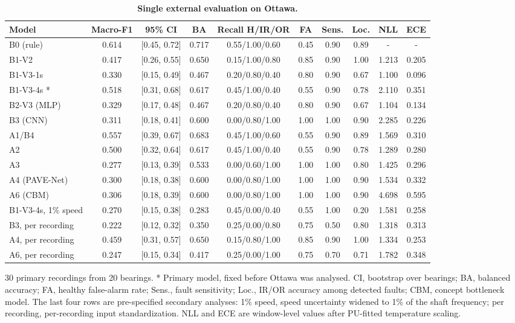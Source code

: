 \documentclass[10pt,letterpaper]{article}
\begin{document}
\begin{table}[!ht]
\centering
\caption{\textbf{Single external evaluation on Ottawa.}}
{\footnotesize
\setlength{\tabcolsep}{4pt}
\renewcommand{\arraystretch}{1.25}
\begin{tabular}{lccccccccc}
\hline
Model & Macro-F1 & 95\% CI & BA & Recall H/IR/OR & FA & Sens. & Loc. & NLL & ECE \\
\hline
B0 (rule) & 0.614 & [0.45, 0.72] & 0.717 & 0.55/1.00/0.60 & 0.45 & 0.90 & 0.89 & - & - \\
B1-V2 & 0.417 & [0.26, 0.55] & 0.650 & 0.15/1.00/0.80 & 0.85 & 0.90 & 1.00 & 1.213 & 0.205 \\
B1-V3-1s & 0.330 & [0.15, 0.49] & 0.467 & 0.20/0.80/0.40 & 0.80 & 0.90 & 0.67 & 1.100 & 0.096 \\
B1-V3-4s * & 0.518 & [0.31, 0.68] & 0.617 & 0.45/1.00/0.40 & 0.55 & 0.90 & 0.78 & 2.110 & 0.351 \\
B2-V3 (MLP) & 0.329 & [0.17, 0.48] & 0.467 & 0.20/0.80/0.40 & 0.80 & 0.90 & 0.67 & 1.104 & 0.134 \\
B3 (CNN) & 0.311 & [0.18, 0.41] & 0.600 & 0.00/0.80/1.00 & 1.00 & 1.00 & 0.90 & 2.285 & 0.226 \\
A1/B4 & 0.557 & [0.39, 0.67] & 0.683 & 0.45/1.00/0.60 & 0.55 & 0.90 & 0.89 & 1.569 & 0.310 \\
A2 & 0.500 & [0.32, 0.64] & 0.617 & 0.45/1.00/0.40 & 0.55 & 0.90 & 0.78 & 1.289 & 0.280 \\
A3 & 0.277 & [0.13, 0.39] & 0.533 & 0.00/0.60/1.00 & 1.00 & 1.00 & 0.80 & 1.425 & 0.296 \\
A4 (PAVE-Net) & 0.300 & [0.18, 0.38] & 0.600 & 0.00/0.80/1.00 & 1.00 & 1.00 & 0.90 & 1.534 & 0.332 \\
A6 (CBM) & 0.306 & [0.18, 0.39] & 0.600 & 0.00/0.80/1.00 & 1.00 & 1.00 & 0.90 & 4.698 & 0.595 \\
\hline
B1-V3-4s, 1\% speed & 0.270 & [0.15, 0.38] & 0.283 & 0.45/0.00/0.40 & 0.55 & 1.00 & 0.20 & 1.581 & 0.258 \\
B3, per recording & 0.222 & [0.12, 0.32] & 0.350 & 0.25/0.00/0.80 & 0.75 & 0.50 & 0.80 & 1.318 & 0.313 \\
A4, per recording & 0.459 & [0.31, 0.57] & 0.650 & 0.15/0.80/1.00 & 0.85 & 0.90 & 1.00 & 1.334 & 0.253 \\
A6, per recording & 0.247 & [0.15, 0.34] & 0.417 & 0.25/0.00/1.00 & 0.75 & 0.70 & 0.71 & 1.782 & 0.348 \\
\hline
\end{tabular}}
\begin{flushleft} 30 primary recordings from 20 bearings. * Primary model, fixed before Ottawa was analysed. CI, bootstrap over bearings; BA, balanced accuracy; FA, healthy false-alarm rate; Sens., fault sensitivity; Loc., IR/OR accuracy among detected faults; CBM, concept bottleneck model. The last four rows are pre-specified secondary analyses: 1\% speed, speed uncertainty widened to 1\% of the shaft frequency; per recording, per-recording input standardization. NLL and ECE are window-level values after PU-fitted temperature scaling. \end{flushleft}
\label{tab:external}
\end{table}
\end{document}
